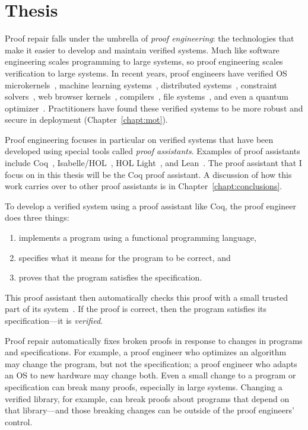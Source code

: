 \section{Thesis}

Proof repair falls under the umbrella of \textit{proof engineering}: the technologies that make it easier
to develop and maintain verified systems.
Much like software engineering scales programming to large systems, so proof engineering scales verification to large systems. 
In recent years, proof engineers have verified OS microkernels~\cite{Klein2009, Klein2014micro}, machine learning systems~\cite{pmlr-v70-selsam17a}, distributed systems~\cite{TODO}, constraint solvers~\cite{TODO}, web browser kernels~\cite{TODO}, compilers~\cite{Leroy:POPL06, Leroy2009}, file systems~\cite{TODO}, and even a quantum optimizer~\cite{TODO}.
Practitioners have found these verified systems to be more robust and secure in deployment (Chapter~\ref{chapt:mot}). %

Proof engineering focuses in particular on verified systems that have been
developed using special tools called \textit{proof assistants}.
Examples of proof assistants include Coq~\cite{coq}, Isabelle/HOL~\cite{isabelle}, 
HOL Light~\cite{hollight}, and Lean~\cite{lean}.
The proof assistant that I focus on in this thesis will be the Coq proof assistant.
A discussion of how this work carries over to other proof assistants is in Chapter~\ref{chapt:conclusions}.

To develop a verified system using a proof assistant like Coq, the proof engineer does three things:

\begin{enumerate}
\item implements a program using a functional programming language,
\item specifies what it means for the program to be correct, and
\item proves that the program satisfies the specification.
\end{enumerate}
This proof assistant then automatically checks this proof with a small trusted part of its system~\cite{Barendregt2002,Barendregt2351}.
If the proof is correct, then the program satisfies its specification---it is \textit{verified}.

Proof repair automatically fixes broken proofs in response to changes in programs and specifications.
For example, a proof engineer who optimizes an algorithm may change the program, but not the specification; a proof engineer who adapts an OS to new hardware may change both. Even a small change to a program or specification can break many proofs, especially in large systems.
Changing a verified library, for example, can break proofs about programs that depend on that library---and those breaking changes
can be outside of the proof engineers' control.

